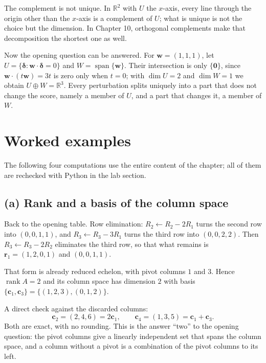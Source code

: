 The complement is not unique. In $\mathbb{R}^{2}$ with $U$ the $x$-axis, every line through the
origin other than the $x$-axis is a complement of $U$; what is unique is not the choice but the
dimension. In Chapter 10, orthogonal complements make that decomposition the shortest one as well.

Now the opening question can be answered. For $\mathbf{w}=(1,1,1)$, let
$U=\{\boldsymbol{\delta}:\mathbf{w}\cdot\boldsymbol{\delta}=0\}$ and
$W=\operatorname{span}\{\mathbf{w}\}$. Their intersection is only $\{\mathbf{0}\}$, since
$\mathbf{w}\cdot(t\mathbf{w})=3t$ is zero only when $t=0$; with $\dim U=2$ and
$\dim W=1$ we obtain $U\oplus W=\mathbb{R}^{3}$. Every perturbation splits uniquely into a part
that does not change the score, namely a member of $U$, and a part that changes it, a member of
$W$.


\section{Worked examples}

The following four computations use the entire content of the chapter; all of them are rechecked
with Python in the lab section.

\subsection*{(a) Rank and a basis of the column space}

Back to the opening table. Row elimination: $R_{2}\leftarrow R_{2}-2R_{1}$ turns the second row
into $(0,0,1,1)$, and $R_{3}\leftarrow R_{3}-3R_{1}$ turns the third row into
$(0,0,2,2)$. Then $R_{3}\leftarrow R_{3}-2R_{2}$ eliminates the third row, so that what remains
is $\mathbf{r}_{1}=(1,2,0,1)$ and $(0,0,1,1)$.

That form is already reduced echelon, with pivot columns $1$ and $3$. Hence
$\operatorname{rank}A=2$ and its column space has dimension $2$ with basis
$\{\mathbf{c}_{1},\mathbf{c}_{3}\}=\{(1,2,3),(0,1,2)\}$.

A direct check against the discarded columns:
\[
  \mathbf{c}_{2}=(2,4,6)=2\mathbf{c}_{1},
  \qquad
  \mathbf{c}_{4}=(1,3,5)=\mathbf{c}_{1}+\mathbf{c}_{3}.
\]
Both are exact, with no rounding. This is the answer ``two'' to the opening question: the pivot
columns give a linearly independent set that spans the column space, and a column without a pivot
is a combination of the pivot columns to its left.


